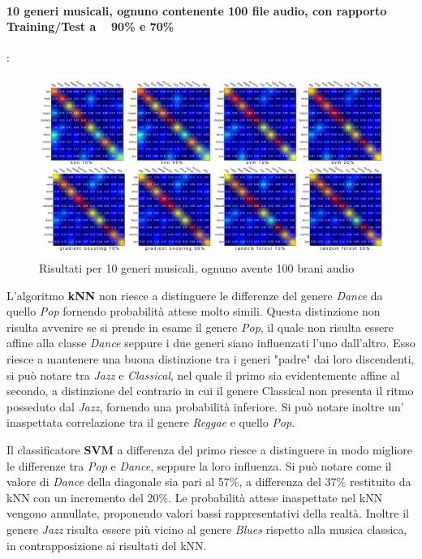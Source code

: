 \documentclass[%
 reprint,
 amsmath,amssymb,
 aps,
 article,
]{revtex4-1}
\begin{document}
\paragraph{10 generi musicali, ognuno contenente 100 file audio, con rapporto Training/Test a ~ 90\% e 70\%}:\\

\begin{figure} [h!]
  \includegraphics[width=\linewidth]{images/Results-100tracksPerGenre-10genres.jpg}
  \caption{Risultati per 10 generi musicali, ognuno avente 100 brani audio}
  \label{fig:r_10_100}
\end{figure}


L'algoritmo \textbf{kNN} non riesce a distinguere le differenze del genere \textit{Dance} da quello \textit{Pop} fornendo probabilità attese molto simili. Questa distinzione non risulta avvenire se si prende in esame il genere \textit{Pop}, il quale non risulta essere affine alla classe \textit{Dance} seppure i due generi siano influenzati l'uno dall'altro. Esso riesce a mantenere una buona distinzione tra i generi "padre" dai loro discendenti, si può notare tra \textit{Jazz} e \textit{Classical}, nel quale il primo sia evidentemente affine al secondo, a distinzione del contrario in cui il genere Classical  non presenta il ritmo posseduto dal \textit{Jazz}, fornendo una probabilità inferiore. Si può notare inoltre un' inaspettata correlazione tra il genere \textit{Reggae} e quello \textit{Pop}. 

Il classificatore \textbf{SVM} a differenza del primo riesce a distinguere in modo migliore le differenze tra \textit{Pop} e \textit{Dance}, seppure la loro influenza. Si può notare come il valore di \textit{Dance} della diagonale sia pari al 57\%, a differenza del 37\% restituito da kNN con un incremento del 20\%. Le probabilità attese inaspettate nel kNN vengono annullate, proponendo valori bassi rappresentativi della realtà. Inoltre il genere \textit{Jazz} risulta essere più vicino al genere \textit{Blues} rispetto alla musica classica, in contrapposizione ai risultati del kNN.\\
\end{document}
